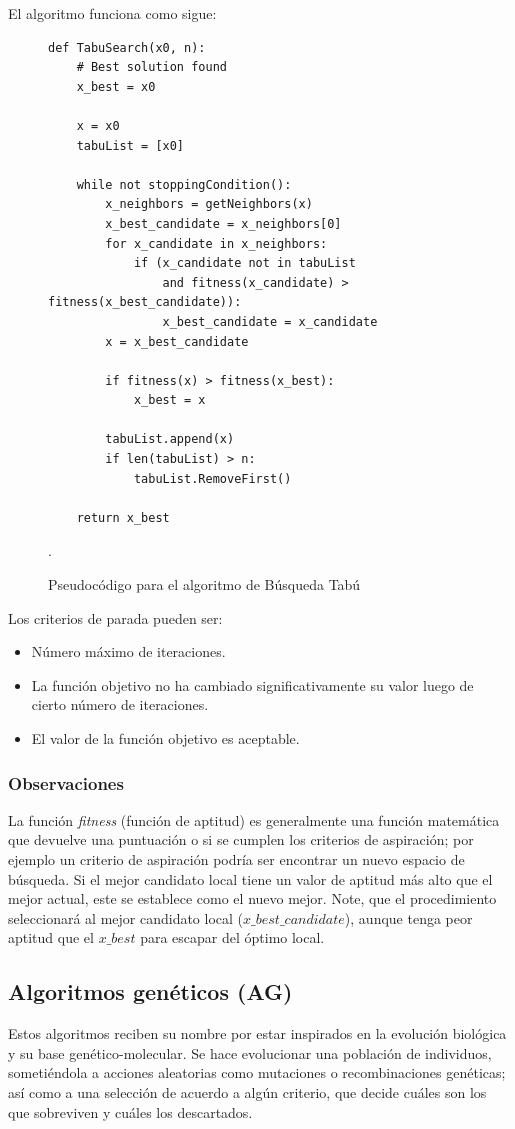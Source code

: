 \documentclass[titlepage, 11pt]{scrartcl}
\begin{document}
			El algoritmo funciona como sigue:
			\begin{figure}[H]
				\begin{verbatim}
def TabuSearch(x0, n):
	# Best solution found 
	x_best = x0
	
	x = x0
	tabuList = [x0]
	
	while not stoppingCondition():
		x_neighbors = getNeighbors(x)
		x_best_candidate = x_neighbors[0]
		for x_candidate in x_neighbors:
			if (x_candidate not in tabuList
				and fitness(x_candidate) > fitness(x_best_candidate)):
				x_best_candidate = x_candidate
		x = x_best_candidate
		
		if fitness(x) > fitness(x_best):
			x_best = x
		
		tabuList.append(x)
		if len(tabuList) > n:
			tabuList.RemoveFirst()
	
	return x_best

				\end{verbatim}
				\caption{Pseudocódigo para el algoritmo de Búsqueda Tabú}.
			\end{figure}
		    
		    Los criterios de parada pueden ser:
		    \begin{itemize}
		    	\item Número máximo de iteraciones.
		    	\item La función objetivo no ha cambiado significativamente su valor luego de cierto número de iteraciones.
		    	\item El valor de la función objetivo es aceptable.
		    \end{itemize}
	    
	    	\subsubsection{Observaciones}
	    		La función \textit{fitness} (función de aptitud) es generalmente una función matemática que devuelve una puntuación o si se cumplen los criterios de aspiración; por ejemplo un criterio de aspiración podría ser encontrar un nuevo espacio de búsqueda. Si el mejor candidato local tiene un valor de aptitud más alto que el mejor actual, este se establece como el nuevo mejor.
			    Note, que el procedimiento seleccionará al mejor candidato local ($x\_best\_candidate$), aunque tenga peor aptitud que el $x\_best$ para escapar del óptimo local.
	    
	    \subsection{Algoritmos genéticos (AG)}
	    	Estos algoritmos reciben su nombre por estar inspirados en la evolución biológica y su base genético-molecular. Se hace evolucionar una población de individuos, sometiéndola a acciones aleatorias como mutaciones o recombinaciones genéticas; así como a una selección de acuerdo a algún criterio, que decide cuáles son los que sobreviven y cuáles los descartados.
	    	
\end{document}
